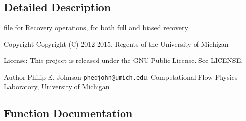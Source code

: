 \subsection{Detailed Description}
file for Recovery operations, for both full and biased recovery \begin{DoxyCopyright}{Copyright}
Copyright (C) 2012-\/2015, Regents of the University of Michigan 
\end{DoxyCopyright}
\begin{DoxyParagraph}{License\-:}
This project is released under the G\-N\-U Public License. See L\-I\-C\-E\-N\-S\-E. 
\end{DoxyParagraph}
\begin{DoxyAuthor}{Author}
Philip E. Johnson {\tt phedjohn@umich.\-edu}, Computational Flow Physics Laboratory, University of Michigan 
\end{DoxyAuthor}


\subsection{Function Documentation}
